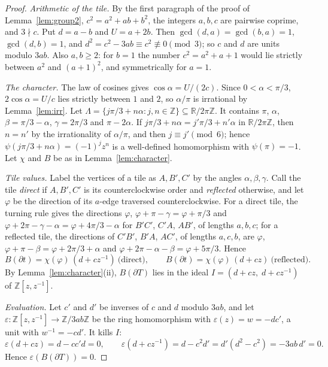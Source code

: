 \documentclass[11pt]{amsart}
\theoremstyle{remark}
\newcommand{\Z}{\mathbb{Z}}
\newcommand{\R}{\mathbb{R}}
\begin{document}
\begin{proof}
\emph{Arithmetic of the tile.} By the first paragraph of the proof of Lemma~\ref{lem:group2}, $c^2=a^2+ab+b^2$, the integers $a,b,c$ are pairwise coprime, and $3\nmid c$. Put $d=a-b$ and $U=a+2b$. Then $\gcd(d,a)=\gcd(b,a)=1$, $\gcd(d,b)=1$, and $d^2=c^2-3ab\equiv c^2\not\equiv0\pmod3$; so $c$ and $d$ are units modulo $3ab$. Also $a,b\ge2$: for $b=1$ the number $c^2=a^2+a+1$ would lie strictly between $a^2$ and $(a+1)^2$, and symmetrically for $a=1$.

\emph{The character.} The law of cosines gives $\cos\alpha=U/(2c)$. Since $0<\alpha<\pi/3$, $2\cos\alpha=U/c$ lies strictly between $1$ and $2$, so $\alpha/\pi$ is irrational by Lemma~\ref{lem:irr}. Let $\Lambda=\{j\pi/3+n\alpha:j,n\in\Z\}\subseteq\R/2\pi\Z$. It contains $\pi$, $\alpha$, $\beta=\pi/3-\alpha$, $\gamma=2\pi/3$ and $\pi-2\alpha$. If $j\pi/3+n\alpha=j'\pi/3+n'\alpha$ in $\R/2\pi\Z$, then $n=n'$ by the irrationality of $\alpha/\pi$, and then $j\equiv j'\pmod 6$; hence $\psi(j\pi/3+n\alpha)=(-1)^jz^n$ is a well-defined homomorphism with $\psi(\pi)=-1$. Let $\chi$ and $B$ be as in Lemma~\ref{lem:character}.

\emph{Tile values.} Label the vertices of a tile as $A,B',C'$ by the angles $\alpha,\beta,\gamma$. Call the tile \emph{direct} if $A,B',C'$ is its counterclockwise order and \emph{reflected} otherwise, and let $\varphi$ be the direction of its $a$-edge traversed counterclockwise. For a direct tile, the turning rule gives the directions $\varphi$, $\varphi+\pi-\gamma=\varphi+\pi/3$ and $\varphi+2\pi-\gamma-\alpha=\varphi+4\pi/3-\alpha$ for $B'C'$, $C'A$, $AB'$, of lengths $a,b,c$; for a reflected tile, the directions of $C'B'$, $B'A$, $AC'$, of lengths $a,c,b$, are $\varphi$, $\varphi+\pi-\beta=\varphi+2\pi/3+\alpha$ and $\varphi+2\pi-\alpha-\beta=\varphi+5\pi/3$. Hence
\[
B(\partial t)=\chi(\varphi)\,(d+cz^{-1})\ \text{(direct)},\qquad
B(\partial t)=\chi(\varphi)\,(d+cz)\ \text{(reflected)}.
\]
By Lemma~\ref{lem:character}(ii), $B(\partial T)$ lies in the ideal $I=(d+cz,\;d+cz^{-1})$ of $\Z[z,z^{-1}]$.

\emph{Evaluation.} Let $c'$ and $d'$ be inverses of $c$ and $d$ modulo $3ab$, and let $\varepsilon:\Z[z,z^{-1}]\to\Z/3ab\Z$ be the ring homomorphism with $\varepsilon(z)=w=-dc'$, a unit with $w^{-1}=-cd'$. It kills $I$:
\[
\varepsilon(d+cz)=d-cc'd=0,\qquad
\varepsilon(d+cz^{-1})=d-c^2d'=d'(d^2-c^2)=-3ab\,d'=0 .
\]
Hence $\varepsilon(B(\partial T))=0$.


\end{proof}
\end{document}
